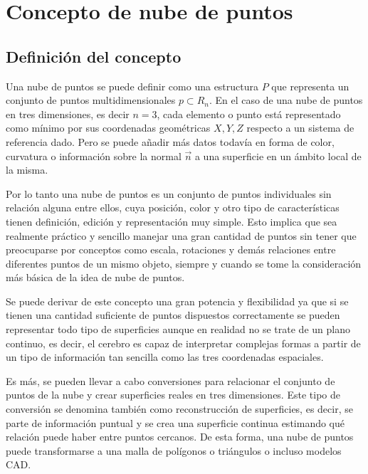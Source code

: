 \section{Concepto de nube de puntos}\label{section:nubes_ejemplo}
\subsection{Definición del concepto}
Una nube de puntos se puede definir como una estructura $P$ que representa un conjunto de puntos multidimensionales $p \subset R_{n}$. En el caso de una nube de puntos en tres dimensiones, es decir $n=3$, cada elemento o punto está representado como mínimo por sus coordenadas geométricas $X,Y, Z$ respecto a un sistema de referencia dado. Pero se puede añadir más datos todavía en forma de color, curvatura o información sobre la normal $\vec{n}$ a una superficie en un ámbito local de la misma.  


Por lo tanto una nube de puntos\cite{point_cloud} es un conjunto de puntos individuales sin relación alguna entre ellos, cuya
posición, color\cite{point_cloud_rgb} y otro tipo de características tienen definición, edición y representación muy simple. Esto implica que sea realmente práctico y sencillo manejar una gran cantidad de puntos sin tener que preocuparse por
conceptos como escala, rotaciones y demás relaciones entre diferentes puntos de un mismo objeto, siempre y cuando se tome la consideración más básica de la idea de nube de puntos.


Se puede derivar de este concepto una gran potencia y flexibilidad ya que si se tienen una cantidad
suficiente de puntos dispuestos correctamente se pueden representar todo tipo de superficies aunque en
realidad no se trate de un plano continuo, es decir, el cerebro es capaz de interpretar complejas formas a
partir de un tipo de información tan sencilla como las tres coordenadas espaciales.

Es más, se pueden llevar a cabo conversiones para relacionar el conjunto de puntos de la nube y crear
superficies reales en tres dimensiones. Este tipo de conversión se denomina también como reconstrucción de superficies, es decir, se parte de información puntual y se crea una superficie continua estimando qué
relación puede haber entre puntos cercanos. De esta forma, una nube de puntos puede transformarse a una
malla de polígonos o triángulos o incluso modelos CAD.

